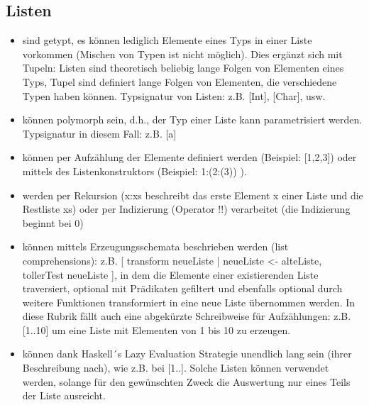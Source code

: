 \subsection{Listen}

\begin{itemize}
	\item sind getypt, es können lediglich Elemente eines Typs in einer Liste vorkommen (Mischen von Typen ist nicht möglich). Dies ergänzt sich mit Tupeln: Listen sind theoretisch beliebig lange Folgen von Elementen eines Typs, Tupel sind definiert lange Folgen von Elementen, die verschiedene Typen haben können. Typsignatur von Listen: z.B. [Int], [Char], usw.
	\item können polymorph sein, d.h., der Typ einer Liste kann parametrisiert werden. Typsignatur in diesem Fall: z.B. [a]
	\item können per Aufzählung der Elemente definiert werden (Beispiel: [1,2,3]) oder mittels des Listenkonstruktors (Beispiel: 1:(2:(3)) ).
	\item werden per Rekursion (x:xs beschreibt das erste Element x einer Liste und die Restliste xs) oder per Indizierung (Operator !!) verarbeitet (die Indizierung beginnt bei 0)
	\item können mittels Erzeugungsschemata beschrieben werden (list comprehensions): z.B. [ transform neueListe | neueListe <- alteListe, tollerTest neueListe ], in dem die Elemente einer existierenden Liste traversiert, optional mit Prädikaten gefiltert und ebenfalls optional durch weitere Funktionen transformiert in eine neue Liste übernommen werden. In diese Rubrik fällt auch eine abgekürzte Schreibweise für Aufzählungen: z.B. [1..10] um eine Liste mit Elementen von 1 bis 10 zu erzeugen.
	\item können dank Haskell´s Lazy Evaluation Strategie unendlich lang sein (ihrer Beschreibung nach), wie z.B. bei [1..]. Solche Listen können verwendet werden, solange für den gewünschten Zweck die Auswertung nur eines Teils der Liste ausreicht.
\end{itemize}

